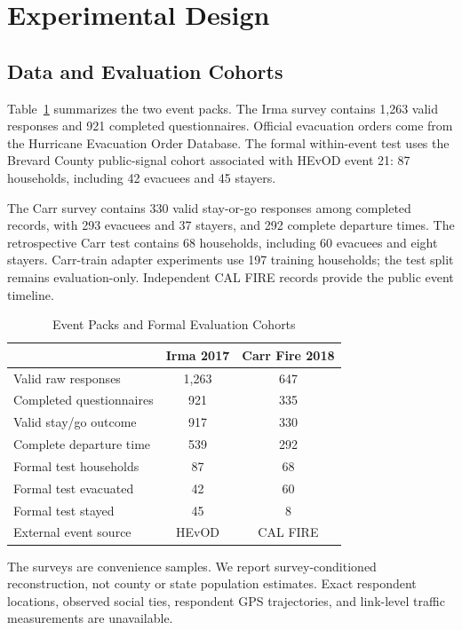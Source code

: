 \documentclass[journal]{IEEEtran}
\begin{document}
\section{Experimental Design}
\label{sec:experiments}
\subsection{Data and Evaluation Cohorts}
Table~\ref{tab:data} summarizes the two event packs. The Irma survey contains
1,263 valid responses and 921 completed questionnaires. Official evacuation
orders come from the Hurricane Evacuation Order Database. The formal
within-event test uses the Brevard County public-signal cohort associated with
HEvOD event 21: 87 households, including 42 evacuees and 45 stayers.

The Carr survey contains 330 valid stay-or-go responses among completed
records, with 293 evacuees and 37 stayers, and 292 complete departure times.
The retrospective Carr test contains 68 households, including 60 evacuees and
eight stayers. Carr-train adapter experiments use 197 training households;
the test split remains evaluation-only. Independent CAL FIRE records provide
the public event timeline.

\begin{table}[!t]
\caption{Event Packs and Formal Evaluation Cohorts}
\label{tab:data}
\centering
\small
\begin{tabular}{lcc}
\toprule
 & Irma 2017 & Carr Fire 2018\\
\midrule
Valid raw responses & 1,263 & 647\\
Completed questionnaires & 921 & 335\\
Valid stay/go outcome & 917 & 330\\
Complete departure time & 539 & 292\\
Formal test households & 87 & 68\\
Formal test evacuated & 42 & 60\\
Formal test stayed & 45 & 8\\
External event source & HEvOD & CAL FIRE\\
\bottomrule
\end{tabular}
\end{table}

The surveys are convenience samples. We report survey-conditioned
reconstruction, not county or state population estimates. Exact respondent
locations, observed social ties, respondent GPS trajectories, and link-level
traffic measurements are unavailable.
\end{document}
